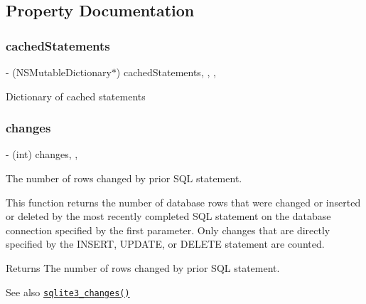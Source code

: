 \subsection{Property Documentation}
\mbox{\label{interface_o_p_t_l_y_f_m_d_b_database_a25e5eb9e27622135363052a7d12bcebe}} 
\subsubsection{\texorpdfstring{cached\+Statements}{cachedStatements}}
{\footnotesize\ttfamily -\/ (N\+S\+Mutable\+Dictionary$\ast$) cached\+Statements\hspace{0.3cm}{\ttfamily [read]}, {\ttfamily [write]}, {\ttfamily [atomic]}, {\ttfamily [retain]}}

Dictionary of cached statements \mbox{\label{interface_o_p_t_l_y_f_m_d_b_database_a757690d92c32d70c0c0402980cb14cee}} 
\subsubsection{\texorpdfstring{changes}{changes}}
{\footnotesize\ttfamily -\/ (int) changes\hspace{0.3cm}{\ttfamily [read]}, {\ttfamily [nonatomic]}, {\ttfamily [assign]}}

The number of rows changed by prior S\+QL statement.

This function returns the number of database rows that were changed or inserted or deleted by the most recently completed S\+QL statement on the database connection specified by the first parameter. Only changes that are directly specified by the I\+N\+S\+E\+RT, U\+P\+D\+A\+TE, or D\+E\+L\+E\+TE statement are counted.

\begin{DoxyReturn}{Returns}
The number of rows changed by prior S\+QL statement.
\end{DoxyReturn}
\begin{DoxySeeAlso}{See also}
\href{http://sqlite.org/c3ref/changes.html}{\tt sqlite3\+\_\+changes()} 
\end{DoxySeeAlso}
\mbox{\label{interface_o_p_t_l_y_f_m_d_b_database_a2962c4e030eb187582879f45745b7824}} 
